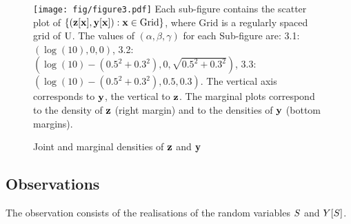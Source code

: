 \begin{figure}[H]
\caption{Joint and marginal densities of $\mathbf{z}$ and $\mathbf{y}$}\label{fig:jointmarginaldensitiesYZ}
\texttt{[image: fig/figure3.pdf]}
\footnotesize{
 Each sub-figure contains the scatter plot of  $\left\{\left(\mathbf{z}[\mathbf{x}],\mathbf{y}[\mathbf{x}]\right):\mathbf{x}\in\mathrm{Grid}\right\}$, where $\mathrm{Grid}$ is a regularly spaced grid of $\mathrm{U}$. The values of $(\alpha, \beta ,\gamma)$ for each Sub-figure are: 3.1: $(\log(10),0,0)$, 3.2:$(\log(10)-(0.5^2+0.3^2),0,\sqrt{0.5^2+0.3^2})$, 3.3: $(\log(10)-(0.5^2+0.3^2),0.5,0.3)$. The vertical axis corresponds to $\mathbf{y}$, the vertical to $\mathbf{z}$. The marginal plots correspond to the density of $\mathbf{z}$ (right margin) and to the densities of $\mathbf{y}$ (bottom margins).}
\end{figure}




\subsection{Observations}
The observation consists of the realisations of the random variables $S$ and $Y[S]$. 

